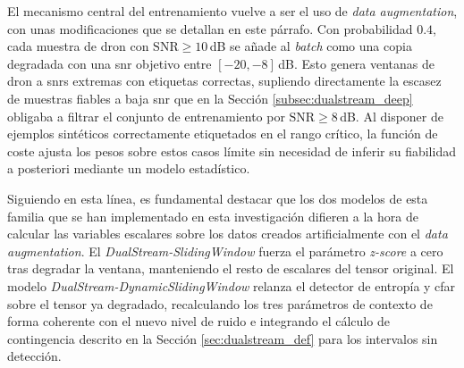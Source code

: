 El mecanismo central del entrenamiento vuelve a ser el uso de \textit{data augmentation}, con unas modificaciones que se detallan en este párrafo. Con probabilidad $0.4$, cada muestra de dron con $\text{SNR} \geq 10$\,dB se añade al \textit{batch} como una copia degradada con una \gls{snr} objetivo entre $[-20, -8]$\,dB. Esto genera ventanas de dron a \gls{snr}s extremas con etiquetas correctas, supliendo directamente la escasez de muestras fiables a baja \gls{snr} que en la Sección \ref{subsec:dualstream_deep} obligaba a filtrar el conjunto de entrenamiento por $\text{SNR} \geq 8$\,dB. Al disponer de ejemplos sintéticos correctamente etiquetados en el rango crítico, la función de coste ajusta los pesos sobre estos casos límite sin necesidad de inferir su fiabilidad a posteriori mediante un modelo estadístico.

Siguiendo en esta línea, es fundamental destacar que los dos modelos de esta familia que se han implementado en esta investigación difieren a la hora de calcular las variables escalares sobre los datos creados artificialmente con el \textit{data augmentation}. El \textit{DualStream-SlidingWindow} fuerza el parámetro \textit{z-score} a cero tras degradar la ventana, manteniendo el resto de escalares del tensor original. El modelo \textit{DualStream-DynamicSlidingWindow} relanza el detector de entropía y \gls{cfar} sobre el tensor ya degradado, recalculando los tres parámetros de contexto de forma coherente con el nuevo nivel de ruido e integrando el cálculo de contingencia descrito en la Sección \ref{sec:dualstream_def} para los intervalos sin detección.